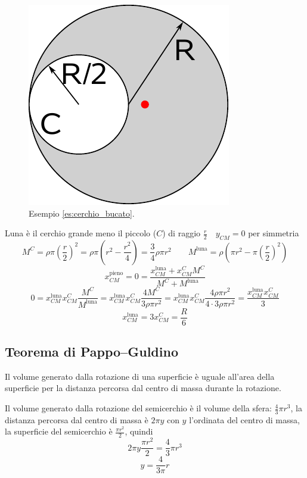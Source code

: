 \begin{Es}
  \label{es:cerchio_bucato}
  \begin{figure}[htp]
    \centering
    \includegraphics[scale=0.7]{immagini/fisica1/luna}
    \caption{Esempio \ref{es:cerchio_bucato}.}
  \end{figure}

  Luna è il cerchio grande meno il piccolo ($C$) di raggio
  $\frac{r}{2} \quad y_{CM}=0$ per simmetria
  \[M^C=\rho\pi\left(\frac{r}{2}\right)^2=\rho\pi\left(r^2-\frac{r^2}{4}\right)=\frac{3}{4}\rho\pi r^2\qquad M^{\text{luna}}=\rho\left(\pi r^2-\pi\left(\frac{r}{2}\right)^2\right)\]
  \[x_{CM}^{\text{pieno}}=0=\frac{x_{CM}^{\text{luna}}+x_{CM}^CM^C}{M^C+M^{\text{luna}}}\]
  \[0=x_{CM}^{\text{luna}}x_{CM}^C\frac{M^C}{M^{\text{luna}}}=x_{CM}^{\text{luna}}x_{CM}^C\frac{4M^C}{3\rho \pi r^2}=x_{CM}^{\text{luna}}x_{CM}^C\frac{4\rho\pi r^2}{4\cdot 3\rho\pi r^2}=\frac{x_{CM}^{\text{luna}}x_{CM}^C}{3}\]
  \[x_{CM}^{\text{luna}}=3x_{CM}^C=\frac{R}{6}\]
\end{Es}

\subsection{Teorema di Pappo--Guldino}
\begin{Teo}
  Il volume generato dalla rotazione di una superficie è uguale
  all'area della superficie per la distanza percorsa dal centro di
  massa durante la rotazione.
\end{Teo}
\begin{Es}[Semicerchio]
  Il volume generato dalla rotazione del semicerchio è il volume della
  sfera: $\frac{4}{3}\pi r^3$, la distanza percorsa dal centro di
  massa è $2\pi y$ con $y$ l'ordinata del centro di massa, la
  superficie del semicerchio è $\frac{\pi r^2}{2}$, quindi
  \[2\pi y\frac{\pi r^2}{2}=\frac{4}{3}\pi r^3\]
  \[y=\frac{4}{3\pi}r\]
\end{Es}

